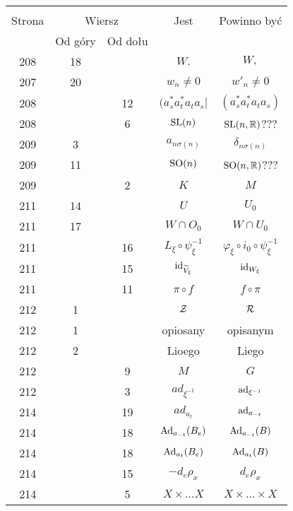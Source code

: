 \documentclass[a4paper,11pt]{article}
\begin{document}
\begin{center}
  \begin{tabular}{|c|c|c|c|c|}
    \hline
    & \multicolumn{2}{c|}{} & & \\
    Strona & \multicolumn{2}{c|}{Wiersz} & Jest
                              & Powinno być \\ \cline{2-3}
    & Od góry & Od dołu & & \\
    \hline
    208 & 18 & & $W.$ & $W,$ \\
    207 & 20 & & $w_{ n } \neq 0$ & $w'_{ n } \neq 0$ \\
    208 & & 12 & $( a^{ * }_{ s } a^{ * }_{ t } a_{ t } a_{ s } |$
           & $( a^{ * }_{ s } a^{ * }_{ t } a_{ t } a_{ s } )$ \\
    208 & &  6 & $\mathrm{SL}( n )$ & $\mathrm{SL}( n, \mathbb{R} )$??? \\
    209 &  3 & & $a_{ n \sigma( n ) }$ & $\delta_{ n \sigma( n ) }$ \\
    209 & 11 & & $\mathrm{SO}( n )$ & $\mathrm{SO}( n, \mathbb{R} )$??? \\
    209 & &  2 & $K$ & $M$ \\
    211 & 14 & & $U$ & $U_{ 0 }$ \\
    211 & 17 & & $W \! \cap \! O_{ 0 }$ & $W \cap U_{ 0 }$ \\[0.2em]
    211 & & 16 & $L_{ \xi } \circ \psi_{ \xi }^{ -1 }$
           & $\varphi_{ \xi } \circ i_{ 0 } \circ \psi_{ \xi }^{ -1 }$ \\[0.3em]
    211 & & 15 & $\mathrm{id}_{ \widetilde{ V }_{ \xi } }$ & $\mathrm{id}_{ W_{ \xi } }$ \\
    211 & & 11 & $\pi \circ f$ & $f \circ \pi$ \\
    212 &  1 & & $\mathcal{Z}$ & $\mathcal{R}$ \\
    212 &  1 & & opiosany & opisanym \\
    212 &  2 & & Lioego & Liego \\
    212 & &  9 & $M$ & $G$ \\
    212 & &  3 & $ad_{ \xi^{ -1 } }$ & $\mathrm{ad}_{ \xi^{ -1 } }$ \\
    214 & & 19 & $ad_{ a_{ t } }$ & $\mathrm{ad}_{ a_{ -t } }$ \\
    214 & & 18 & $\mathrm{Ad}_{ a_{ -t } }( B_{ e } )$
           & $\mathrm{Ad}_{ a_{ -t } }( B )$ \\
    214 & & 18 & $\mathrm{Ad}_{ a_{ t } }( B_{ e } )$ & $\mathrm{Ad}_{ a_{ t } }( B )$ \\
    214 & & 15 & $-d_{ e }\rho_{ x }$ & $d_{ e }\rho_{ x }$ \\
    214 & &  5 & $X \times \ldots X$ & $X \times \ldots \times X$ \\

\end{tabular}
\end{center}
\end{document}
